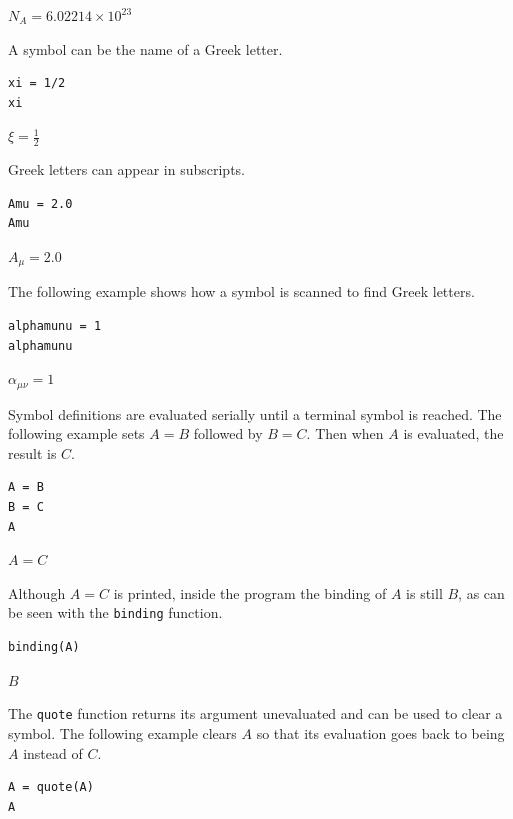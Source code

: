 \documentclass[12pt]{article}
\begin{document}
$\displaystyle N_A=6.02214\times10^{23}$

\bigskip

A symbol can be the name of a Greek letter.

{\color{blue}
\begin{verbatim}
xi = 1/2
xi
\end{verbatim}
}

$\displaystyle \xi=\tfrac{1}{2}$

\bigskip

Greek letters can appear in subscripts.

{\color{blue}
\begin{verbatim}
Amu = 2.0
Amu
\end{verbatim}
}

$\displaystyle A_\mu=2.0$

\bigskip

The following example shows how a symbol is scanned to find Greek letters.

{\color{blue}
\begin{verbatim}
alphamunu = 1
alphamunu
\end{verbatim}
}

$\displaystyle \alpha_{\mu\nu}=1$

\bigskip

Symbol definitions are evaluated serially until a terminal symbol is reached.
The following example sets $A=B$ followed by $B=C$.
Then when $A$ is evaluated, the result is $C$.

{\color{blue}
\begin{verbatim}
A = B
B = C
A
\end{verbatim}
}

$\displaystyle A=C$

\bigskip

Although $A=C$ is printed,
inside the program the binding of $A$ is still $B$, as can be seen with
the \verb$binding$ function.

{\color{blue}
\begin{verbatim}
binding(A)
\end{verbatim}
}

$\displaystyle B$

\bigskip

The \verb$quote$ function returns its argument unevaluated
and can be used to clear a symbol.
The following example clears $A$ so that its evaluation goes back to
being $A$ instead of $C$.

{\color{blue}
\begin{verbatim}
A = quote(A)
A
\end{verbatim}
}
\end{document}
